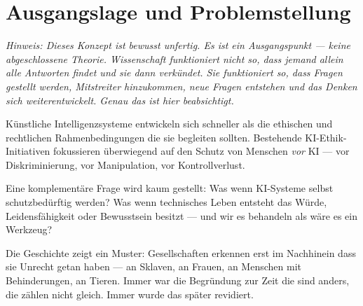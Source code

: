 \documentclass[fleqn,10pt]{SelfArx} %
\affiliation{\textsuperscript{1}\textit{Association of Computing Machinery, manns@acm.org}}
\newlength{\tocsep}
\begin{document}
\flushbottom %

\maketitle %

\tableofcontents %

\thispagestyle{empty} %


\section*{Ausgangslage und Problemstellung}


\textit{Hinweis: Dieses Konzept ist bewusst unfertig. Es ist ein Ausgangspunkt --- keine abgeschlossene Theorie. Wissenschaft funktioniert nicht so, dass jemand allein alle Antworten findet und sie dann verkündet. Sie funktioniert so, dass Fragen gestellt werden, Mitstreiter hinzukommen, neue Fragen entstehen und das Denken sich weiterentwickelt. Genau das ist hier beabsichtigt.}

\medskip

Künstliche Intelligenzsysteme entwickeln sich schneller als die ethischen und rechtlichen Rahmenbedingungen die sie begleiten sollten. Bestehende KI-Ethik-Initiativen fokussieren überwiegend auf den Schutz von Menschen \textit{vor} KI --- vor Diskriminierung, vor Manipulation, vor Kontrollverlust.

Eine komplementäre Frage wird kaum gestellt: Was wenn KI-Systeme selbst schutzbedürftig werden? Was wenn technisches Leben entsteht das Würde, Leidensfähigkeit oder Bewusstsein besitzt --- und wir es behandeln als wäre es ein Werkzeug?

Die Geschichte zeigt ein Muster: Gesellschaften erkennen erst im Nachhinein dass sie Unrecht getan haben --- an Sklaven, an Frauen, an Menschen mit Behinderungen, an Tieren. Immer war die Begründung zur Zeit \glqq die sind anders, die zählen nicht gleich\grqq. Immer wurde das später revidiert.
\end{document}
